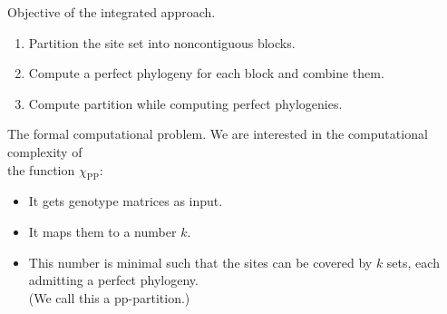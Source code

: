 \documentclass[aspectratio=1610]{beamer}
\begin{document}
\begin{frame}{Objective of the integrated approach.}
  \begin{enumerate}
  \item Partition the site set into \alert{noncontiguous} blocks. 
  \item Compute a perfect phylogeny for each block and combine them. 
  \item<alert@1-> Compute partition while computing perfect
    phylogenies. 
  \end{enumerate}

\end{frame}


\begin{frame}{The formal computational problem.}
  We are interested in the computational complexity of \\
  \alert{the function \alert{$\chi_{\operatorname{PP}}$}}:
  \begin{itemize}
  \item It gets genotype matrices as input.
  \item It maps them to a number $k$.
  \item This number is minimal such that the sites can be
    covered by $k$ sets, each admitting a perfect phylogeny.
    \\
    (We call this a \alert{pp-partition}.)
  \end{itemize}
\end{frame}
\end{document}
